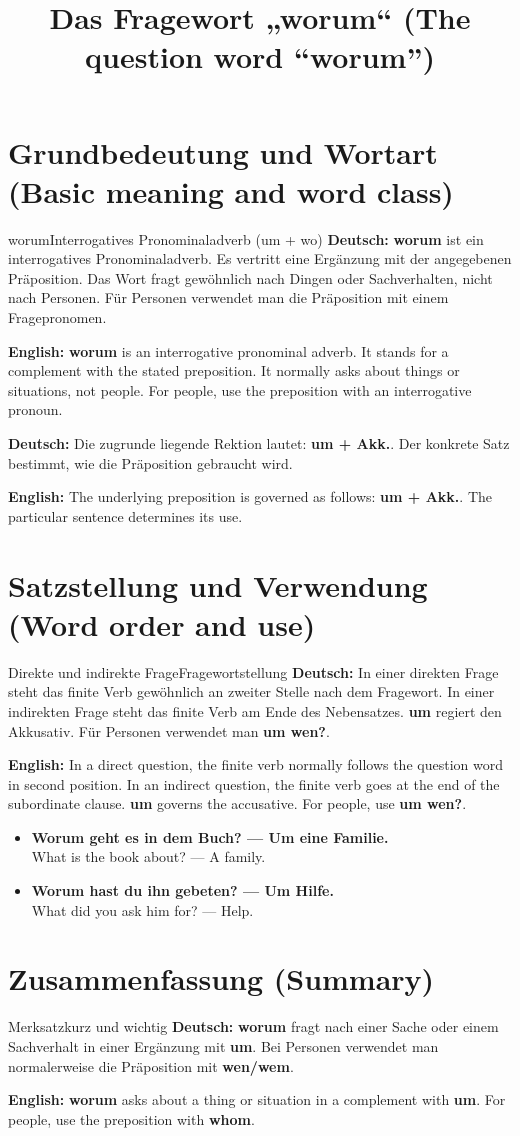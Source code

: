 \documentclass[a4paper,11pt]{article}
\title{Das Fragewort „worum“ (The question word “worum”)}
\date{}
\newcommand{\GermanText}[1]{\textbf{Deutsch: }#1\par}
\newcommand{\EnglishText}[1]{{\small\color{SoftGray}\textbf{English: }#1\par}}
\newcommand{\ExampleItem}[2]{\item \textbf{#1}\\{\small\color{SoftGray}#2}}
\begin{document}
\maketitle
\tableofcontents
\newpage
\section{Grundbedeutung und Wortart (Basic meaning and word class)}
\begin{grammarentry}{worum}{Interrogatives Pronominaladverb (um + wo)}
\GermanText{\textbf{worum} ist ein interrogatives Pronominaladverb. Es vertritt eine Ergänzung mit der angegebenen Präposition. Das Wort fragt gewöhnlich nach Dingen oder Sachverhalten, nicht nach Personen. Für Personen verwendet man die Präposition mit einem Fragepronomen.}
\EnglishText{\textbf{worum} is an interrogative pronominal adverb. It stands for a complement with the stated preposition. It normally asks about things or situations, not people. For people, use the preposition with an interrogative pronoun.}
\GermanText{Die zugrunde liegende Rektion lautet: \textbf{um + Akk.}. Der konkrete Satz bestimmt, wie die Präposition gebraucht wird.}
\EnglishText{The underlying preposition is governed as follows: \textbf{um + Akk.}. The particular sentence determines its use.}
\end{grammarentry}
\section{Satzstellung und Verwendung (Word order and use)}
\begin{grammarentry}{Direkte und indirekte Frage}{Fragewortstellung}
\GermanText{In einer direkten Frage steht das finite Verb gewöhnlich an zweiter Stelle nach dem Fragewort. In einer indirekten Frage steht das finite Verb am Ende des Nebensatzes. \textbf{um} regiert den Akkusativ. Für Personen verwendet man \textbf{um wen?}.}
\EnglishText{In a direct question, the finite verb normally follows the question word in second position. In an indirect question, the finite verb goes at the end of the subordinate clause. \textbf{um} governs the accusative. For people, use \textbf{um wen?}.}
\end{grammarentry}
\begin{exbox}\begin{itemize}
\ExampleItem{Worum geht es in dem Buch? — Um eine Familie.}{What is the book about? — A family.}
\ExampleItem{Worum hast du ihn gebeten? — Um Hilfe.}{What did you ask him for? — Help.}
\end{itemize}\end{exbox}
\section{Zusammenfassung (Summary)}
\begin{grammarentry}{Merksatz}{kurz und wichtig}
\GermanText{\textbf{worum} fragt nach einer Sache oder einem Sachverhalt in einer Ergänzung mit \textbf{um}. Bei Personen verwendet man normalerweise die Präposition mit \textbf{wen/wem}.}
\EnglishText{\textbf{worum} asks about a thing or situation in a complement with \textbf{um}. For people, use the preposition with \textbf{whom}.}
\end{grammarentry}
\end{document}
